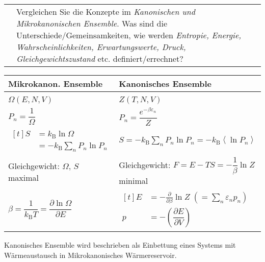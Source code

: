 \documentclass[a4paper,12pt]{scrartcl}
\makeatletter
\def\pf#1#2{\frac{\partial #1}{\partial #2}}		%
\def\dpf#1#2{\dfrac{\partial #1}{\partial #2}}		%
\def\kb#1{\left\langle #1\right\rangle}			%
\def\kB{k_\mathrm{B}}					%
\newcounter{qc}\setcounter{qc}{1}
\newenvironment{fshaded}{
\def\FrameCommand{\fcolorbox{framecolor}{shadecolor}}
\MakeFramed {\FrameRestore}}
{\endMakeFramed}
\def\frage#1{
\begin{fshaded}
\noindent
\begin{tabularx}{0.99\textwidth}{@{}c!{\color{framecolor}\vline}X}
{ \bf \rm \theqc }	&	\noindent #1
\end{tabularx}
\stepcounter{qc}
\end{fshaded}
}
\makeatother
\begin{document}


\frage{Vergleichen Sie die Konzepte im \textit{Kanonischen und Mikrokanonischen Ensemble}. Was sind die 
Unterschiede/Gemeinsamkeiten, wie werden \textit{Entropie, Energie, Wahrscheinlichkeiten, Erwartungswerte, Druck, 
Gleichgewichtszustand} etc. definiert/errechnet?}
\noindent
\begin{tabularx}{\textwidth}{@{}p{}|X}
\textbf{Mikrokanon. Ensemble} & \textbf{Kanonisches Ensemble}\\
\hline{}
\\
$\Omega(E,N,V)$ & $Z(T,N,V)$ \\
$P_n=\dfrac{1}{\Omega}$ & $P_n=\dfrac{e^{-\beta \varepsilon_n}}{Z}$\\
$\begin{aligned}[t] S&=\kB  \ln \Omega\\ &=-\kB \sum_n P_n\ln P_n \end{aligned}$ & $S=-\kB  \sum_n P_n \ln P_n = -\kB  \kb{\ln 
P_n}$\\
Gleichgewicht: $\Omega,\,S$ maximal & Gleichgewicht: $F=E-TS=-\dfrac{1}{\beta}\ln Z$ minimal\\
$\beta=\dfrac{1}{\kB  T}=\dpf{\ln \Omega}{E}$ & $\begin{aligned}[t] E&=-\pf{}{\beta}\ln Z\;(=\sum_n \varepsilon_n p_n)\\ 
p&=-\left( \dpf{E}{V} \right) \end{aligned}$
\end{tabularx}
\vspace{.5cm}

\noindent Kanonisches Ensemble wird beschrieben als Einbettung eines Systems mit Wärmeaustausch in Mikrokanonisches 
Wärmereservoir.\\
\end{document}
